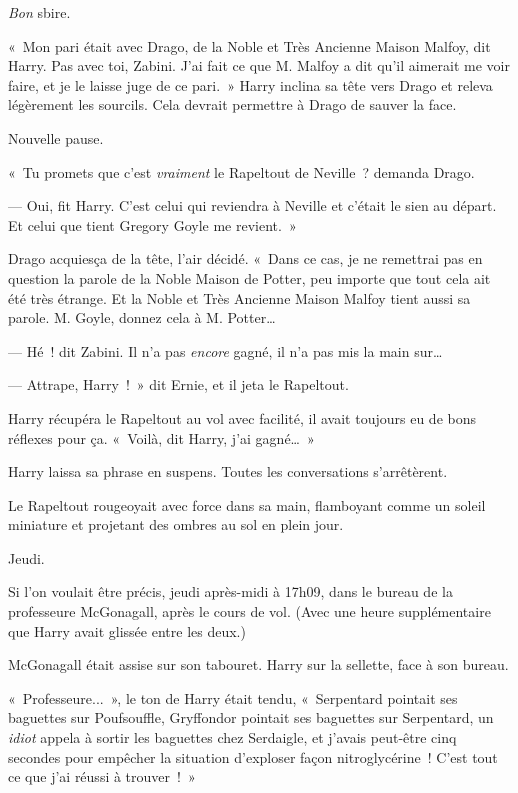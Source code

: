 \emph{Bon} sbire.

«~Mon pari était avec Drago, de la Noble et Très Ancienne Maison Malfoy, dit Harry.
Pas avec toi, Zabini.
J'ai fait ce que M. Malfoy a dit qu'il aimerait me voir faire, et je le laisse juge de ce pari.~»
Harry inclina sa tête vers Drago et releva légèrement les sourcils.
Cela devrait permettre à Drago de sauver la face.

Nouvelle pause.

«~Tu promets que c'est \emph{vraiment} le Rapeltout de Neville~? demanda Drago.

--- Oui, fit Harry.
C'est celui qui reviendra à Neville et c'était le sien au départ.
Et celui que tient Gregory Goyle me revient.~»

Drago acquiesça de la tête, l'air décidé.
«~Dans ce cas, je ne remettrai pas en question la parole de la Noble Maison de Potter, peu importe que tout cela ait été très étrange.
Et la Noble et Très Ancienne Maison Malfoy tient aussi sa parole.
M. Goyle, donnez cela à M. Potter…

--- Hé~! dit Zabini.
Il n'a pas \emph{encore} gagné, il n'a pas mis la main sur…

--- Attrape, Harry~!~» dit Ernie, et il jeta le Rapeltout.

Harry récupéra le Rapeltout au vol avec facilité, il avait toujours eu de bons réflexes pour ça.
«~Voilà, dit Harry, j'ai gagné…~»

Harry laissa sa phrase en suspens. Toutes les conversations s'arrêtèrent.

Le Rapeltout rougeoyait avec force dans sa main, flamboyant comme un soleil miniature et projetant des ombres au sol en plein jour.

\later

Jeudi.

Si l'on voulait être précis, jeudi après-midi à 17h09, dans le bureau de la professeure McGonagall, après le cours de vol.
(Avec une heure supplémentaire que Harry avait glissée entre les deux.)

McGonagall était assise sur son tabouret.
Harry sur la sellette, face à son bureau.

«~Professeure...~», le ton de Harry était tendu, «~Serpentard pointait ses baguettes sur Poufsouffle, Gryffondor pointait ses baguettes sur Serpentard, un \emph{idiot} appela à sortir les baguettes chez Serdaigle, et j'avais peut-être cinq secondes pour empêcher la situation d'exploser façon nitroglycérine~!
C'est tout ce que j'ai réussi à trouver~!~»

